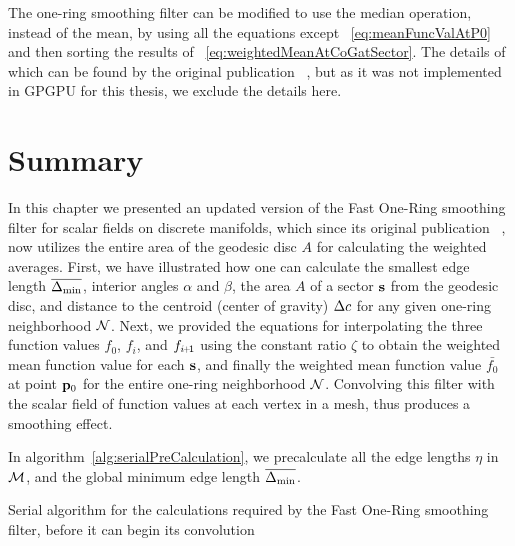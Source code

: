 The one-ring smoothing filter can be modified to use the median operation, instead of the mean, by using all the equations except ~\ref{eq:meanFuncValAtP0} and then sorting the results of ~\ref{eq:weightedMeanAtCoGatSector}. The details of which can be found by the original publication ~\cite[s.~3.2]{Mara17}, but as it was not implemented in GPGPU for this thesis, we exclude the details here.
%
\section{Summary}
\label{cFONSsS}
In this chapter we presented an updated version of the Fast One-Ring smoothing filter for scalar fields on discrete manifolds, which since its original publication ~\cite[s.~3.2]{Mara17}, now utilizes the entire area of the geodesic disc $A$ for calculating the weighted averages. First, we have illustrated how one can calculate the smallest edge length $\overline{\Delta_\text{min}}$, interior angles $\alpha$ and $\beta$, the area $A$ of a sector $\mathbf{s}$ from the geodesic disc, and distance to the centroid (center of gravity) $\Delta c$ for any given one-ring neighborhood $\mathcal{N}$. Next, we provided the equations for interpolating the three function values $f_0$, $f_i$, and $f_{\sipo}$ using the constant ratio $\zeta$ to obtain the weighted mean function value for each $\mathbf{s}$, and finally the weighted mean function value $\bar{f_0}$ at point ${\mathbf{p}_0}$ for the entire one-ring neighborhood $\mathcal{N}$. Convolving this filter with the scalar field of function values at each vertex in a mesh, thus produces a smoothing effect.

In algorithm~\ref{alg:serialPreCalculation}, we precalculate all the edge lengths $\eta$ in $\mathcal{M}$, and the global minimum edge length $\overline{\Delta_\text{min}}$.
\begin{algorithm}
	\DontPrintSemicolon
	

	\bigskip
	\;
\nl	{}
	\caption{Serial algorithm for the calculations required by the Fast One-Ring smoothing filter, before it can begin its convolution \label{alg:serialPreCalculation}}
\end{algorithm}%
%
%

